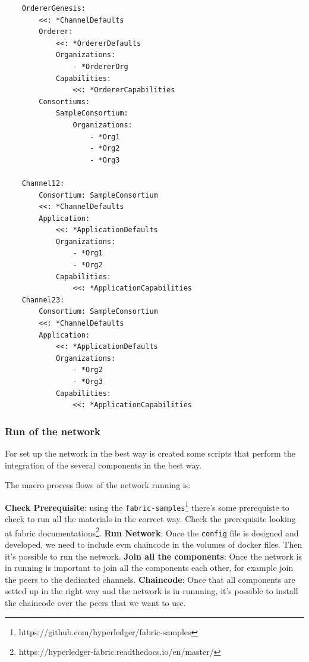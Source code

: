 \begin{lstlisting}
    OrdererGenesis:
        <<: *ChannelDefaults
        Orderer:
            <<: *OrdererDefaults
            Organizations:
                - *OrdererOrg
            Capabilities:
                <<: *OrdererCapabilities
        Consortiums:
            SampleConsortium:
                Organizations:
                    - *Org1
                    - *Org2
                    - *Org3

    Channel12:
        Consortium: SampleConsortium
        <<: *ChannelDefaults
        Application:
            <<: *ApplicationDefaults
            Organizations:
                - *Org1
                - *Org2
            Capabilities:
                <<: *ApplicationCapabilities
    Channel23:
        Consortium: SampleConsortium
        <<: *ChannelDefaults
        Application:
            <<: *ApplicationDefaults
            Organizations:
                - *Org2
                - *Org3
            Capabilities:
                <<: *ApplicationCapabilities    
\end{lstlisting}

\subsubsection{Run of the network}

For set up the network in the best way is created some scripts that perform the integration of the several components in the best way.

The macro process flows of the network running is:
\begin{outline}[enumerate]
    \1 \textbf{Check Prerequisite}: using the \texttt{fabric-samples}\footnote{https://github.com/hyperledger/fabric-samples} there's
    some prerequiste to check to run all the materials in the correct way. Check the prerequisite looking at fabric documentations\footnote{https://hyperledger-fabric.readthedocs.io/en/master/}.
    \1 \textbf{Run Network}: Once the \texttt{config} file is designed and developed, we need to include evm chaincode in the volumes of docker files. Then it's possible to run the network.
    \1 \textbf{Join all the components}: Once the network is in running is important to join all the components each other, for example join the peers to the dedicated channels.
    \1 \textbf{Chaincode}: Once that all components are setted up in the right way and the network is in runnning, it's possible to install the
    chaincode over the peers that we want to use. 
\end{outline}

